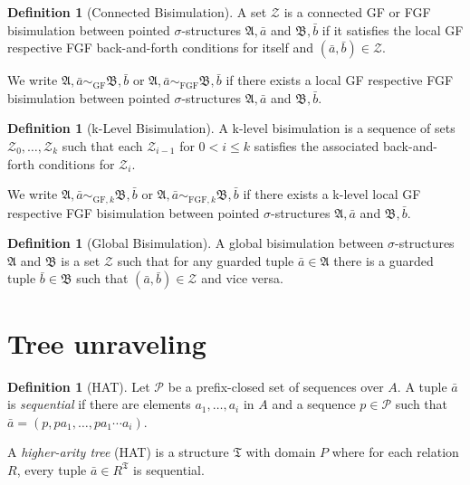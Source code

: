 \documentclass[draft]{scrartcl}
\theoremstyle{definition}
\newtheorem{definition}[theorem]{Definition}
\begin{document}
\begin{definition}[Connected Bisimulation]
A set $\mathcal{Z}$ is a connected GF or FGF bisimulation between pointed $\sigma$-structures $\mathfrak{A}, \bar{a}$ and $\mathfrak{B}, \bar{b}$ if it satisfies the local GF respective FGF back-and-forth conditions for itself and $(\bar{a}, \bar{b}) \in \mathcal{Z}$.
\end{definition}

We write $\mathfrak{A}, \bar{a} \sim_{\textrm{GF}} \mathfrak{B}, \bar{b}$ or $\mathfrak{A}, \bar{a} \sim_{\textrm{FGF}} \mathfrak{B}, \bar{b}$ if there exists a local GF respective FGF bisimulation between pointed $\sigma$-structures $\mathfrak{A}, \bar{a}$ and $\mathfrak{B}, \bar{b}$.

\begin{definition}[k-Level Bisimulation]
A k-level bisimulation is a sequence of sets $\mathcal{Z}_0, \ldots, \mathcal{Z}_k$ such that each $\mathcal{Z}_{i - 1}$ for $0 < i \le k$ satisfies the associated back-and-forth conditions for $\mathcal{Z}_i$.
\end{definition}

We write $\mathfrak{A}, \bar{a} \sim_{\textrm{GF}, k} \mathfrak{B}, \bar{b}$ or $\mathfrak{A}, \bar{a} \sim_{\textrm{FGF}, k} \mathfrak{B}, \bar{b}$ if there exists a k-level local GF respective FGF bisimulation between pointed $\sigma$-structures $\mathfrak{A}, \bar{a}$ and $\mathfrak{B}, \bar{b}$.

\begin{definition}[Global Bisimulation]
A global bisimulation between $\sigma$-structures $\mathfrak{A}$ and $\mathfrak{B}$ is a set $\mathcal{Z}$ such that for any guarded tuple $\bar{a} \in \mathfrak{A}$ there is a guarded tuple $\bar{b} \in \mathfrak{B}$ such that $(\bar{a}, \bar{b}) \in \mathcal{Z}$ and vice versa.
\end{definition}

\section{Tree unraveling}

\begin{definition}[HAT]
Let $\mathcal{P}$ be a prefix-closed set of sequences over $A$.
A tuple $\bar{a}$ is \emph{sequential} if there are elements $a_1, \ldots, a_i$ in $A$ and a sequence $p \in \mathcal{P}$ such that $\bar{a} = (p, p a_1, \ldots, p a_1 \cdots a_i)$.

A \emph{higher-arity tree} (HAT) is a structure $\mathfrak{T}$ with domain $P$ where for each relation $R$, every tuple $\bar{a} \in R^\mathfrak{T}$ is sequential.
\end{definition}
\end{document}
